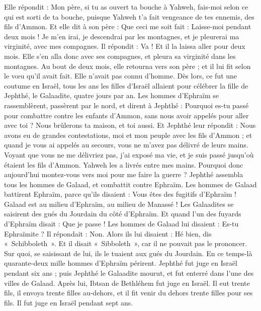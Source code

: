 \begin{multicols}{2}
Elle répondit : Mon père, si tu as ouvert ta bouche à Yahweh, fais-moi selon ce qui est sorti de ta bouche, puisque Yahweh t'a fait vengeance de tes ennemis, des fils d'Ammon.
Et elle dit à son père : Que ceci me soit fait : Laisse-moi pendant deux mois ! Je m'en irai, je descendrai par les montagnes, et je pleurerai ma virginité, avec mes compagnes.
Il répondit : Va ! Et il la laissa aller pour deux mois. Elle s'en alla donc avec ses compagnes, et pleura sa virginité dans les montagnes.
Au bout de deux mois, elle retourna vers son père ; et il lui fit selon le vœu qu'il avait fait. Elle n'avait pas connu d'homme. Dès lors, ce fut une coutume en Israël,
tous les ans les filles d'Israël allaient pour célébrer la fille de Jephthé, le Galaadite, quatre jours par an.
\VerseOne{}Les hommes d'Ephraïm se rassemblèrent, passèrent par le nord, et dirent à Jephthé : Pourquoi es-tu passé pour combattre contre les enfants d'Ammon, sans nous avoir appelés pour aller avec toi ? Nous brûlerons ta maison, et toi aussi.
Et Jephthé leur répondit : Nous avons eu de grandes contestations, moi et mon peuple avec les fils d'Ammon ; et quand je vous ai appelés au secours, vous ne m'avez pas délivré de leurs mains.
Voyant que vous ne me délivriez pas, j'ai exposé ma vie, et je suis passé jusqu'où étaient les fils d'Ammon. Yahweh les a livrés entre mes mains. Pourquoi donc aujourd'hui montez-vous vers moi pour me faire la guerre ?
Jephthé assembla tous les hommes de Galaad, et combattit contre Ephraïm. Les hommes de Galaad battirent Ephraïm, parce qu'ils disaient : Vous êtes des fugitifs d'Ephraïm ! Galaad est au milieu d'Ephraïm, au milieu de Manassé !
Les Galaadites se saisirent des gués du Jourdain du côté d'Ephraïm. Et quand l'un des fuyards d'Ephraïm disait : Que je passe ! Les hommes de Galaad lui disaient : Es-tu Ephraïmite ? Il répondait : Non.
Alors ils lui disaient : Hé bien, dis «~Schibboleth~». Et il disait «~Sibboleth~», car il ne pouvait pas le prononcer. Sur quoi, se saisissant de lui, ils le tuaient aux gués du Jourdain. En ce temps-là quarante-deux mille hommes d'Ephraïm périrent.
Jephthé fut juge en Israël pendant six ans ; puis Jephthé le Galaadite mourut, et fut enterré dans l'une des villes de Galaad.
Après lui, Ibtsan de Bethléhem fut juge en Israël.
Il eut trente fils, il envoya trente filles au-dehors, et il fit venir du dehors trente filles pour ses fils. Il fut juge en Israël pendant sept ans.

\end{multicols}
